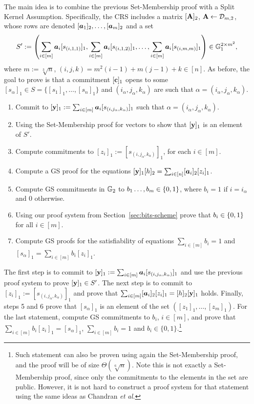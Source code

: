 The main idea is to combine the previous Set-Membership proof with a Split Kernel Assumption. Specifically, the CRS includes a matrix $[\mathbf{{A}}]_2$, $\mathbf{{A}} \gets\mathcal{D}_{m,2}$, whose rows are denoted $[{\boldsymbol a}_1]_2,\ldots,[{\boldsymbol a}_m]_2$ and a set 
$$S':=\left(\sum_{i\in[m]}{\boldsymbol a}_i[s_{(i,1,1)}]_1,\sum_{i\in[m]}{\boldsymbol a}_i[s_{(i,1,2)}]_1,\ldots,\sum_{i\in[m]}{\boldsymbol a}_i[s_{(i,m,m)}]_1\right)\in\mathbb{G}_1^{2\times m^2},$$
where $m:=\sqrt[3]{n}$, $(i,j,k)=m^2(i-1)+m(j-1)+k\in[n]$. As before, the goal to prove is that a commitment $[\mathbf{c}]_1$ opens to some $[s_{\alpha}]_1 \in S=\{[s_1]_1,\ldots,[s_n]_1\}$ and  $(i_{\alpha},j_{\alpha},k_{\alpha})$ are such that $\alpha=(i_{\alpha},j_{\alpha},k_{\alpha})$.

\begin{enumerate}
\item Commit to $[\mathbf{y}]_1:=\sum_{i\in[m]}{\boldsymbol a}_i[s_{(i,j_\alpha,k_\alpha)}]_1$ such that $\alpha=(i_\alpha,j_\alpha,k_\alpha)$.
\item Using the Set-Membership proof for vectors to show that $[\mathbf{y}]_1$ is an element of $S'$.
\item Compute commitments to $[z_i]_1:=[s_{(i,j_\alpha,k_\alpha)}]_1$, for each $i\in[m]$.
\item Compute a GS proof for the equations $[\mathbf{y}]_1[h]_2=\sum_{i\in[n]}[{\boldsymbol a}_i]_2 [z_i]_1$. 
\item Compute GS commitments in $\mathbb{G}_2$ to $b_1\ldots,b_m\in\{0,1\}$,
      where $b_i = 1$ if $i=i_\alpha$ and $0$ otherwise.
\item Using our proof system from Section~\ref{sec:bits-scheme} prove that $b_i\in\{0,1\}$ for all $i\in[m]$.
\item Compute GS proofs for the satisfiability of equations $\sum_{i\in[m]}b_i=1$ and $[s_{\alpha}]_1=\sum_{i\in[m]}b_i[z_i]_1$.
\end{enumerate}

The first step is to commit to $[\mathbf{y}]_1:= \sum_{i\in[m]} {\boldsymbol a}_i [s_{(i,j_\alpha,k_\alpha)}]_1$ and use the previous proof system to prove $[\mathbf{y}]_1 \in S'$. The next step is to commit to $[z_i]_1:=[s_{(i,j_\alpha,k_\alpha)}]_1$ and prove that $\sum_{i\in[m]}[{\boldsymbol a}_i]_2[z_i]_1 = [h]_2[\mathbf{y}]_1$ holds. Finally, steps 5 and 6 prove that $[s_{\alpha}]_1$ is an element of the set $([z_1]_1,\ldots,[z_m]_1)$. For the last statement, compute GS commitments to $b_i$, $i \in [m]$, 
and prove that $\sum_{i\in[m]}b_i[z_i]_1=[s_{\alpha}]_1$, $\sum_{i\in[m]}b_i=1$ and $b_i \in \{0,1\}$.\footnote{Such statement can also be proven using again the Set-Membership proof, and the proof will be of size $\Theta(\sqrt[6]{n})$. Note this is not exactly a Set-Membership proof, since only the commitments to the elements in the set are public. However, it is not hard to construct a proof system for that statement using the same ideas as Chandran \textit{et al.} }

